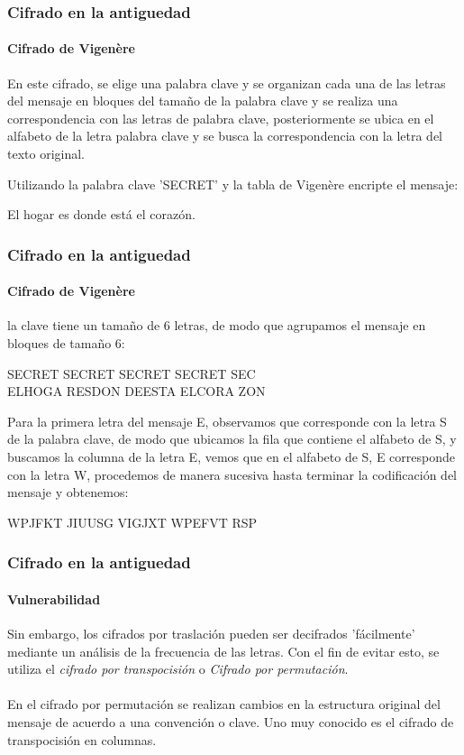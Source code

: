 \documentclass[spanish, mexico]{beamer}
\begin{document}
	\begin{frame}
		\frametitle{Cifrado en la antiguedad}
		\framesubtitle{Cifrado de Vigenère}
		En este cifrado, se elige una palabra clave y se organizan cada una de las letras del mensaje en bloques del tamaño de la palabra clave y se realiza una correspondencia con las letras de palabra clave, posteriormente se ubica en el alfabeto de la letra palabra clave y se busca la correspondencia con la letra del texto original.
		\begin{example}
			Utilizando la palabra clave 'SECRET' y la tabla de Vigenère encripte el mensaje:
			\begin{center}
				El hogar es donde está el corazón.
			\end{center}
		\end{example}
	\end{frame}
	\begin{frame}
		\frametitle{Cifrado en la antiguedad}
		\framesubtitle{Cifrado de Vigenère}
		\begin{solution}
			la clave tiene un tamaño de 6 letras, de modo que agrupamos el mensaje en bloques de tamaño 6:
			\begin{center}
				SECRET SECRET SECRET SECRET SEC\\
				ELHOGA RESDON DEESTA ELCORA ZON
			\end{center}
			Para la primera letra del mensaje E, observamos que corresponde con la letra S de la palabra clave, de modo que ubicamos la fila que contiene el alfabeto de S, y buscamos la columna de la letra E, vemos que en el alfabeto de S, E corresponde con la letra W, procedemos de manera sucesiva hasta terminar la codificación del mensaje y obtenemos:
			\begin{center}
				WPJFKT JIUUSG VIGJXT WPEFVT RSP
			\end{center}
		\end{solution}
	\end{frame}

	\begin{frame}
		\frametitle{Cifrado en la antiguedad}
		\framesubtitle{Vulnerabilidad}
		Sin embargo, los cifrados por traslación pueden ser decifrados 'fácilmente' mediante un análisis de la frecuencia de las letras. Con el fin de evitar esto, se utiliza el \textit{cifrado por transpocisión} o \textit{Cifrado por permutación}.\\~\\
		En el cifrado por permutación se realizan cambios en la estructura original del mensaje de acuerdo a una convención o clave. Uno muy conocido es el cifrado de transpocisión en columnas.
	\end{frame}
\end{document}
